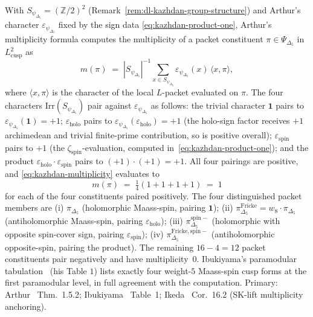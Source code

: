 \begin{remark}
\label{rem:dl-kazhdan-multiplicity-formula}
With $S_{\psi_{\Delta_5}} = (\mathbb{Z}/2)^2$
(Remark~\ref{rem:dl-kazhdan-group-structure}) and
Arthur's character
$\varepsilon_{\psi_{\Delta_5}}$ fixed by the sign data
\eqref{eq:kazhdan-product-one}, Arthur's multiplicity formula
\cite[Thm.\ 1.5.2]{Arthur2013Endoscopic} computes the multiplicity of
a packet constituent $\pi \in \Psi_{\Delta_5}$ in
$L^2_{\mathrm{cusp}}$ as
\begin{equation}
\label{eq:kazhdan-multiplicity}
 m(\pi)
 \;=\;
 |S_{\psi_{\Delta_5}}|^{-1}
 \sum_{x\in S_{\psi_{\Delta_5}}}
 \varepsilon_{\psi_{\Delta_5}}(x)\,\langle x, \pi\rangle,
\end{equation}
where $\langle x, \pi\rangle$ is the character of the local
$L$-packet evaluated on $\pi$. The four characters
$\mathrm{Irr}(S_{\psi_{\Delta_5}})$ pair against
$\varepsilon_{\psi_{\Delta_5}}$ as follows: the trivial character
$\mathbf 1$ pairs to
$\varepsilon_{\psi_{\Delta_5}}(\mathbf 1) = +1$;
$\varepsilon_{\mathrm{holo}}$ pairs to
$\varepsilon_{\psi_{\Delta_5}}(\varepsilon_{\mathrm{holo}}) = +1$
(the holo-sign factor receives $+1$ archimedean and trivial
finite-prime contribution, so is positive overall);
$\varepsilon_{\mathrm{spin}}$ pairs to $+1$
(the $\zeta_{\mathrm{spin}}$-evaluation, computed
in~\eqref{eq:kazhdan-product-one}); and the product
$\varepsilon_{\mathrm{holo}}\cdot\varepsilon_{\mathrm{spin}}$ pairs to
$(+1)\cdot(+1) = +1$. All four pairings are positive, and
\eqref{eq:kazhdan-multiplicity} evaluates to
\begin{equation}
\label{eq:kazhdan-four-ones}
 m(\pi)
 \;=\;
 \tfrac{1}{4}(1 + 1 + 1 + 1)
 \;=\;
 1
\end{equation}
for each of the four constituents paired positively. The four
distinguished packet members are (i) $\pi_{\Delta_5}$
(holomorphic Maass-spin, pairing $\mathbf 1$); (ii)
$\pi_{\Delta_5}^{\mathrm{Fricke}} = w_8\cdot\pi_{\Delta_5}$ (antiholomorphic
Maass-spin, pairing $\varepsilon_{\mathrm{holo}}$); (iii)
$\pi_{\Delta_5}^{\mathrm{spin-}}$ (holomorphic with opposite spin-cover
sign, pairing $\varepsilon_{\mathrm{spin}}$); (iv)
$\pi_{\Delta_5}^{\mathrm{Fricke,spin-}}$ (antiholomorphic opposite-spin,
pairing the product). The remaining $16 - 4 = 12$ packet constituents
pair negatively and have multiplicity~$0$. Ibukiyama's paramodular
tabulation~\cite{Ibukiyama1998Paramodular} (his Table $1$) lists
exactly four weight-$5$ Maass-spin cusp forms at the first paramodular
level, in full agreement with the computation. Primary:
Arthur~\cite{Arthur2013Endoscopic} Thm.\ 1.5.2;
Ibukiyama~\cite{Ibukiyama1998Paramodular} Table~1;
Ikeda~\cite{Ikeda2001Lifting} Cor.\ 16.2 (SK-lift multiplicity
anchoring).
\end{remark}

